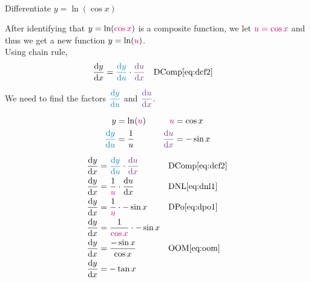 \begin{example}[id:20141128-155506] \label{20141128-155506} \hfill \\

Differentiate $y=\ln(\cos x)$

\soln

\solnsteps
After identifying that $y=\ln (\cRed{\cos x})$ is a composite function, we let $\cRed{u=\cos x}$ and thus we get a new function $y=\ln (\cRed{u})$.\\

Using chain rule, 
\begin{align*}
\dydx &= \cBlue{\dydu} \cdot \cPurple{\dudx} && \text{DComp} \eqref{eq:dcf2}
\end{align*}

We need to find the factors $\cBlue{\dydu}$ and $\cPurple{\dudx}$.

\begin{alignat*}{2}
		y &= \ln (\cRed{u})				&\quad	 		\cRed{u}		&= \cos x \\
	\cBlue{\dydu} &= \dfrac{1}{u}		&\quad 	 \cPurple{\dudx}	 &= - \sin x 
\end{alignat*}

\begin{align*}
\dydx &= \cBlue{\dydu} \cdot \cPurple{\dudx} && \text{DComp} \eqref{eq:dcf2} \\
\dydx &= \dfrac{1}{\cRed{u}} \cdot \dudx && \text{DNL} \eqref{eq:dnl1} \\
\dydx &= \dfrac{1}{\cRed{u}} \cdot - \sin x && \text{DPo} \eqref{eq:dpo1} \\
\dydx &= \dfrac{1}{\cRed{\cos x}} \cdot - \sin x \\	%
\dydx &= \dfrac{-\sin x}{\cos x} && \text{OOM} \eqref{eq:oom} \\
\dydx &= -\tan x %
\end{align*}
\end{example}

